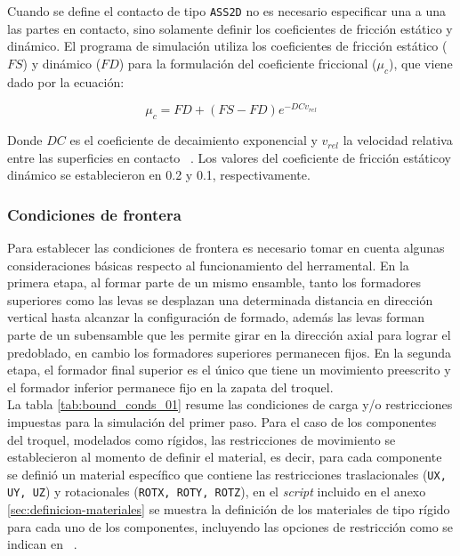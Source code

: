 Cuando se define el contacto de tipo \texttt{ASS2D} no es necesario especificar una a una las partes 
en contacto, sino solamente definir los coeficientes de fricción estático y dinámico. El programa de 
simulación utiliza los coeficientes de fricción estático ($FS$) y dinámico ($FD$) para la 
formulación del coeficiente friccional ($\mu_c$), que viene dado por la ecuación: ~\cite{lsdyna-manual}

\begin{equation}
\mu_c = FD + (FS - FD) e^{-DCv_{rel}}
\label{eq:frictional_coeff}
\end{equation}

Donde $DC$ es el coeficiente de decaimiento exponencial y $v_{rel}$ la velocidad relativa
entre las superficies en contacto ~\cite{lsdyna-ansys-manual}. Los valores del coeficiente de 
fricción estáticoy dinámico se establecieron en 0.2 y 0.1, respectivamente. ~\cite{carvill1993}

\subsubsection{Condiciones de frontera}\label{sec:condiciones-fronteras}

Para establecer las condiciones de frontera es necesario tomar en cuenta algunas  consideraciones 
básicas respecto al funcionamiento del herramental. En la primera etapa, al formar parte de un 
mismo ensamble, tanto los formadores superiores como las levas se desplazan una determinada distancia 
en dirección vertical hasta alcanzar la configuración de formado, además las levas forman 
parte de un subensamble que les permite girar en la dirección axial para lograr el predoblado, en 
cambio los formadores superiores permanecen fijos. En la segunda etapa, el formador final superior 
es el único que tiene un movimiento preescrito y el formador inferior permanece fijo en la zapata del troquel. \\

La tabla \ref{tab:bound_conds_01} resume las condiciones de carga y/o restricciones impuestas 
para la simulación del primer paso. Para el caso de los componentes del troquel, modelados como 
rígidos, las restricciones de movimiento se establecieron al momento de definir el material, 
es decir, para cada componente se definió un material específico que contiene las restricciones 
traslacionales ({\tt UX, UY, UZ}) y rotacionales ({\tt ROTX, ROTY, ROTZ}), en el \textit{script} 
incluido en el anexo \ref{sec:definicion-materiales} se muestra la definición de los materiales 
de tipo rígido para cada uno de los componentes, incluyendo las opciones de restricción como 
se indican en ~\cite{lsdyna-ansys-manual}. \\

